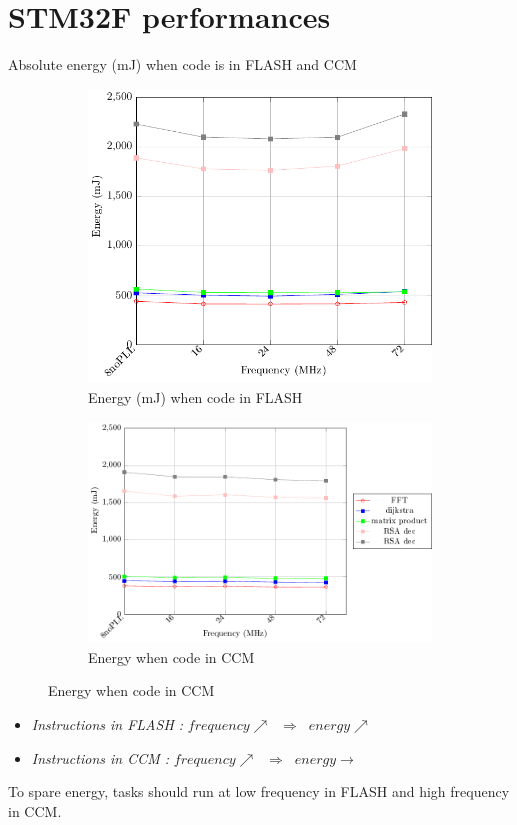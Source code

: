 \documentclass[
	11pt, %
]{beamer}
\begin{document}
\section{STM32F performances}
\begin{frame}{Absolute energy (mJ) when code is in FLASH and CCM}
	\begin{figure}
		\begin{subfigure}{0.4\textwidth}
			\includegraphics[scale = 0.4]{data/stm32f_v2/abs/abs_flash_energy32f.pdf}
			\caption{Energy (mJ) when code in FLASH}
		\end{subfigure}
		\begin{subfigure}{0.4\textwidth}
			\includegraphics[scale = 0.4]{data/stm32f_v2/abs/abs_ccm_energy32f.pdf}
			\caption{Energy when code in CCM}
		\end{subfigure}
		
	\end{figure}
	\begin{itemize}
		\item \emph{Instructions in FLASH :} $frequency \nearrow \; \; \Rightarrow \; \; energy \nearrow$
		\item \emph{Instructions in CCM : } $frequency \nearrow \; \; \Rightarrow \; \; energy \rightarrow$ 
	\end{itemize}
	To spare energy, tasks should run at low frequency in FLASH and high frequency in CCM.
\end{frame}
\end{document}
